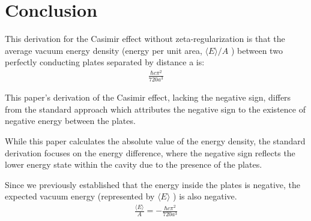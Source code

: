 \section{Conclusion}

This derivation for the Casimir effect without zeta-regularization is that the average vacuum energy density 
(energy per unit area, \(\langle E \rangle/A\) ) between two perfectly conducting plates separated by distance a is:
\begin{align}\frac{\hbar c \pi^2}{720 a^3}\end{align}

This paper's derivation of the Casimir effect, lacking the negative sign,  
differs from the standard approach which attributes the negative sign to the existence of negative energy between the plates. 

While this paper calculates the absolute value of the energy density, the standard derivation focuses on the energy difference, 
where the negative sign reflects the lower energy state within the cavity due to the presence of the plates.

Since we previously established that the energy inside the plates is negative, 
the expected vacuum energy (represented by $\langle E \rangle$ ) is also negative.
\begin{align}
    \frac{\langle E \rangle}{A} = -\frac{\hbar c \pi^2}{720 a^3}
\end{align}